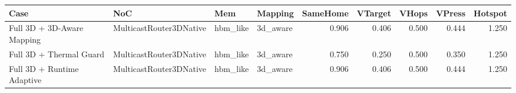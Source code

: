\begin{tabular}{l l l l r r r r r}
\hline
Case & NoC & Mem & Mapping & SameHome & VTarget & VHops & VPress & Hotspot \\
\hline
Full 3D + 3D-Aware Mapping & MulticastRouter3DNative & hbm\_like & 3d\_aware & 0.906 & 0.406 & 0.500 & 0.444 & 1.250 \\
Full 3D + Thermal Guard & MulticastRouter3DNative & hbm\_like & 3d\_aware & 0.750 & 0.250 & 0.500 & 0.350 & 1.250 \\
Full 3D + Runtime Adaptive & MulticastRouter3DNative & hbm\_like & 3d\_aware & 0.906 & 0.406 & 0.500 & 0.444 & 1.250 \\
\hline
\end{tabular}
